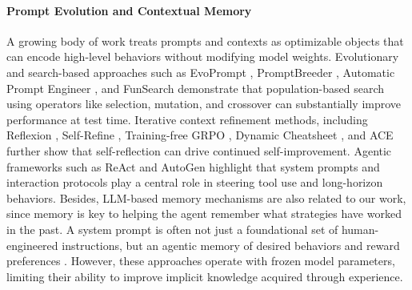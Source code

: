 \documentclass{article}
\theoremstyle{plain}
\theoremstyle{definition}
\theoremstyle{remark}
\begin{document}
\paragraph{Prompt Evolution and Contextual Memory} A growing body of work treats prompts and contexts as optimizable objects that can encode high-level behaviors without modifying model weights. Evolutionary and search-based approaches such as EvoPrompt \cite{evoprompt}, PromptBreeder \cite{promptbreeder}, Automatic Prompt Engineer \cite{zhou2022large}, and FunSearch \cite{romera2024mathematical} demonstrate that population-based search using operators like selection, mutation, and crossover can substantially improve performance at test time. Iterative context refinement methods, including Reflexion \cite{reflexion}, Self-Refine \cite{self-refine}, Training-free GRPO \cite{train-free-grpo}, Dynamic Cheatsheet \cite{dynamic-cheatsheet}, and ACE \cite{agentic-context-eng} further show that self-reflection can drive continued self-improvement. Agentic frameworks such as ReAct \cite{react} and AutoGen \cite{autogen} highlight that system prompts and interaction protocols play a central role in steering tool use and long-horizon behaviors. Besides, LLM-based memory mechanisms \cite{memgpt, memorybank, gist-memory, agentic-memory} are also related to our work, since memory is key to helping the agent remember what strategies have worked in the past. A system prompt is often not just a foundational set of human-engineered instructions, but an agentic memory of desired behaviors and reward preferences \cite{reasoningbank}.
However, these approaches operate with frozen model parameters, limiting their ability to improve implicit knowledge acquired through experience.

\vspace{-8pt}
\end{document}
